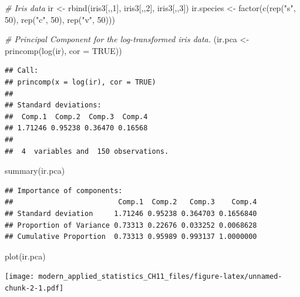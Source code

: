 \documentclass[
]{article}
\newenvironment{Shaded}{\begin{snugshade}}{\end{snugshade}}
\newcommand{\AttributeTok}[1]{\textcolor[rgb]{0.77,0.63,0.00}{#1}}
\newcommand{\CommentTok}[1]{\textcolor[rgb]{0.56,0.35,0.01}{\textit{#1}}}
\newcommand{\ConstantTok}[1]{\textcolor[rgb]{0.00,0.00,0.00}{#1}}
\newcommand{\DecValTok}[1]{\textcolor[rgb]{0.00,0.00,0.81}{#1}}
\newcommand{\FunctionTok}[1]{\textcolor[rgb]{0.00,0.00,0.00}{#1}}
\newcommand{\NormalTok}[1]{#1}
\newcommand{\OtherTok}[1]{\textcolor[rgb]{0.56,0.35,0.01}{#1}}
\newcommand{\StringTok}[1]{\textcolor[rgb]{0.31,0.60,0.02}{#1}}
\begin{document}
\begin{Shaded}
\begin{Highlighting}[]
\CommentTok{\# Iris data}
\NormalTok{ir }\OtherTok{\textless{}{-}} \FunctionTok{rbind}\NormalTok{(iris3[,,}\DecValTok{1}\NormalTok{], iris3[,,}\DecValTok{2}\NormalTok{], iris3[,,}\DecValTok{3}\NormalTok{])}
\NormalTok{ir.species }\OtherTok{\textless{}{-}} \FunctionTok{factor}\NormalTok{(}\FunctionTok{c}\NormalTok{(}\FunctionTok{rep}\NormalTok{(}\StringTok{"s"}\NormalTok{, }\DecValTok{50}\NormalTok{), }\FunctionTok{rep}\NormalTok{(}\StringTok{"c"}\NormalTok{, }\DecValTok{50}\NormalTok{), }\FunctionTok{rep}\NormalTok{(}\StringTok{"v"}\NormalTok{, }\DecValTok{50}\NormalTok{)))}

\CommentTok{\# Principal Component for the log{-}transformed iris data.}
\NormalTok{(ir.pca }\OtherTok{\textless{}{-}} \FunctionTok{princomp}\NormalTok{(}\FunctionTok{log}\NormalTok{(ir), }\AttributeTok{cor =} \ConstantTok{TRUE}\NormalTok{))}
\end{Highlighting}
\end{Shaded}

\begin{verbatim}
## Call:
## princomp(x = log(ir), cor = TRUE)
## 
## Standard deviations:
##  Comp.1  Comp.2  Comp.3  Comp.4 
## 1.71246 0.95238 0.36470 0.16568 
## 
##  4  variables and  150 observations.
\end{verbatim}

\begin{Shaded}
\begin{Highlighting}[]
\FunctionTok{summary}\NormalTok{(ir.pca)}
\end{Highlighting}
\end{Shaded}

\begin{verbatim}
## Importance of components:
##                         Comp.1  Comp.2   Comp.3    Comp.4
## Standard deviation     1.71246 0.95238 0.364703 0.1656840
## Proportion of Variance 0.73313 0.22676 0.033252 0.0068628
## Cumulative Proportion  0.73313 0.95989 0.993137 1.0000000
\end{verbatim}

\begin{Shaded}
\begin{Highlighting}[]
\FunctionTok{plot}\NormalTok{(ir.pca)}
\end{Highlighting}
\end{Shaded}

\texttt{[image: modern\_applied\_statistics\_CH11\_files/figure-latex/unnamed-chunk-2-1.pdf]}
\end{document}
